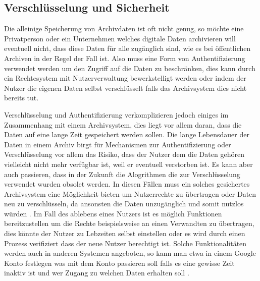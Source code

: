 \documentclass[conference,compsoc,final,a4paper]{IEEEtran}
\begin{document}
\subsection{Verschlüsselung und Sicherheit}
Die alleinige Speicherung von Archivdaten ist oft nicht genug, so möchte eine Privatperson oder ein Unternehmen welches digitale Daten archivieren will eventuell nicht, dass diese Daten für alle zugänglich sind, wie es bei öffentlichen Archiven in der Regel der Fall ist. Also muss eine Form von Authentifizierung verwendet werden um den Zugriff auf die Daten zu beschränken, dies kann durch ein Rechtesystem mit Nutzerverwaltung bewerkstelligt werden oder indem der Nutzer die eigenen Daten selbst verschlüsselt falls das Archivsystem dies nicht bereits tut.

Verschlüsselung und Authentifizierung verkomplizieren jedoch einiges im Zusammenhang mit einem Archivsystem, dies liegt vor allem daran, dass die Daten auf eine lange Zeit gespeichert werden sollen. Die lange Lebensdauer der Daten in einem Archiv birgt für Mechanismen zur Authentifizierung oder Verschlüsselung vor allem das Risiko, dass der Nutzer dem die Daten gehören vielleicht nicht mehr verfügbar ist, weil er eventuell verstorben ist. Es kann aber auch passieren, dass in der Zukunft die Alogrithmen die zur Verschlüsselung verwendet wurden obsolet werden. In diesen Fällen muss ein solches gesichertes Archivsystem eine Möglichkeit bieten um Nutzerrechte zu übertragen oder Daten neu zu verschlüsseln, da ansonsten die Daten unzugänglich und somit nutzlos würden \autocite{Storer2006}. Im Fall des ablebens eines Nutzers ist es möglich Funktionen bereitzustellen um die Rechte beispielsweise an einen Verwandten zu übertragen, dies könnte der Nutzer zu Lebzeiten selbst einstellen oder es wird durch einen Prozess verifiziert dass der neue Nutzer berechtigt ist. Solche Funktionalitäten werden auch in anderen Systemen angeboten, so kann man etwa in einem Google Konto festlegen was mit dem Konto passieren soll falls es eine gewisse Zeit inaktiv ist und wer Zugang zu welchen Daten erhalten soll \autocite{GoogleKontoaktivität}.
\end{document}
